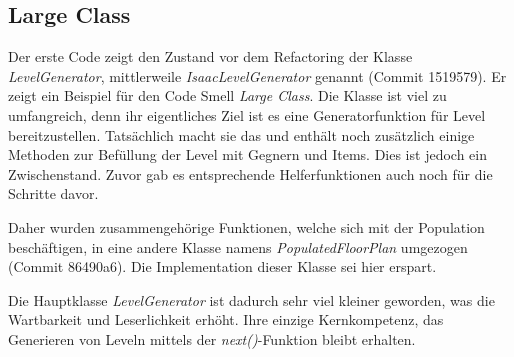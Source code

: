 \subsection*{Large Class}
Der erste Code zeigt den Zustand vor dem Refactoring der Klasse 
\textit{LevelGenerator}, mittlerweile \textit{IsaacLevelGenerator}
genannt (Commit 1519579). Er zeigt ein Beispiel für den Code Smell
\textit{Large Class}. Die Klasse ist viel zu umfangreich, denn ihr
eigentliches Ziel ist es eine Generatorfunktion für Level bereitzustellen.
Tatsächlich macht sie das und enthält noch zusätzlich einige Methoden
zur Befüllung der Level mit Gegnern und Items. Dies ist jedoch ein
Zwischenstand. Zuvor gab es entsprechende Helferfunktionen auch noch
für die Schritte davor.

Daher wurden zusammengehörige Funktionen, welche sich mit der
Population beschäftigen, in eine andere Klasse namens
\textit{PopulatedFloorPlan} umgezogen (Commit 86490a6). Die
Implementation dieser Klasse sei hier erspart.

Die Hauptklasse \textit{LevelGenerator} ist dadurch sehr viel kleiner
geworden, was die Wartbarkeit und Leserlichkeit erhöht. Ihre einzige
Kernkompetenz, das Generieren von Leveln mittels der
\textit{next()}-Funktion bleibt erhalten.

